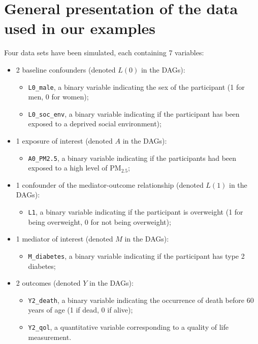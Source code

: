 \documentclass[
]{book}
\providecommand{\tightlist}{%
  \setlength{\itemsep}{0pt}\setlength{\parskip}{0pt}}
\begin{document}
\section{General presentation of the data used in our examples}\label{general-presentation-of-the-data-used-in-our-examples}

Four data sets have been simulated, each containing 7 variables:

\begin{itemize}
\tightlist
\item
  2 baseline confounders (denoted \(L(0)\) in the DAGs):

  \begin{itemize}
  \tightlist
  \item
    \texttt{L0\_male}, a binary variable indicating the sex of the participant (1 for men, 0 for women);
  \item
    \texttt{L0\_soc\_env}, a binary variable indicating if the participant has been exposed to a deprived social environment);
  \end{itemize}
\item
  1 exposure of interest (denoted \(A\) in the DAGs):

  \begin{itemize}
  \tightlist
  \item
    \texttt{A0\_PM2.5}, a binary variable indicating if the participants had been exposed to a high level of \(\text{PM}_{2.5}\);
  \end{itemize}
\item
  1 confounder of the mediator-outcome relationship (denoted \(L(1)\) in the DAGs):

  \begin{itemize}
  \tightlist
  \item
    \texttt{L1}, a binary variable indicating if the participant is overweight (1 for being overweight, 0 for not being overweight);
  \end{itemize}
\item
  1 mediator of interest (denoted \(M\) in the DAGs):

  \begin{itemize}
  \tightlist
  \item
    \texttt{M\_diabetes}, a binary variable indicating if the participant has type 2 diabetes;
  \end{itemize}
\item
  2 outcomes (denoted \(Y\) in the DAGs):

  \begin{itemize}
  \tightlist
  \item
    \texttt{Y2\_death}, a binary variable indicating the occurrence of death before 60 years of age (1 if dead, 0 if alive);
  \item
    \texttt{Y2\_qol}, a quantitative variable corresponding to a quality of life measurement.
  \end{itemize}
\end{itemize}
\end{document}
